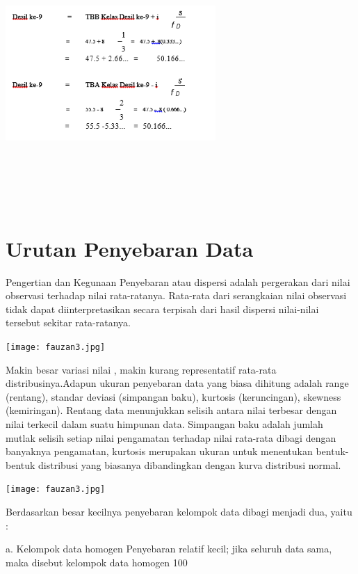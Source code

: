 \documentclass[11pt,fleqn]{book} %
\begin{document}
{\includegraphics[width = 8cm, height= 10cm]{Pictures/rizkie23.png}

\section{Urutan Penyebaran Data}
Pengertian dan Kegunaan
Penyebaran atau dispersi adalah pergerakan dari nilai observasi terhadap nilai rata-ratanya. Rata-rata dari serangkaian nilai observasi tidak dapat diinterpretasikan secara terpisah dari hasil dispersi nilai-nilai tersebut sekitar rata-ratanya.

\texttt{[image: fauzan3.jpg]}

 Makin besar variasi nilai , makin kurang representatif rata-rata distribusinya.Adapun ukuran penyebaran data yang biasa dihitung adalah range (rentang), standar deviasi (simpangan  baku),  kurtosis (keruncingan), skewness (kemiringan). Rentang data menunjukkan selisih antara nilai terbesar dengan nilai terkecil dalam suatu himpunan data. Simpangan baku adalah jumlah mutlak selisih setiap nilai pengamatan terhadap nilai rata-rata dibagi dengan banyaknya pengamatan, kurtosis merupakan ukuran untuk menentukan bentuk-bentuk distribusi yang biasanya dibandingkan dengan kurva distribusi normal.
 
 \texttt{[image: fauzan3.jpg]}


Berdasarkan besar kecilnya penyebaran  kelompok data dibagi menjadi dua, yaitu :

a. Kelompok data homogen 
Penyebaran relatif kecil; jika seluruh data sama, maka disebut kelompok data homogen 100%

}
\end{document}
